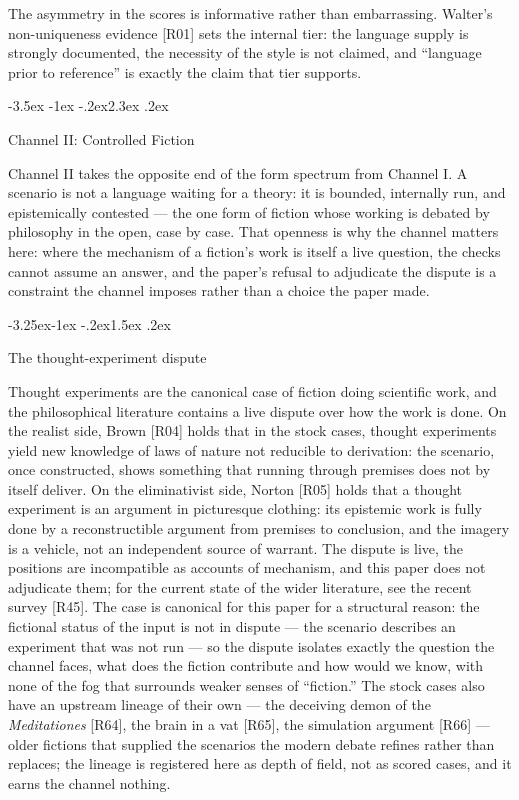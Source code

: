 \documentclass[11pt,a4paper]{article}
\makeatletter
\renewcommand\section{\@startsection{section}{1}{\z@}%
  {-3.5ex \@plus -1ex \@minus -.2ex}{2.3ex \@plus .2ex}%
  {\normalfont\Large\bfseries\raggedright}}
\renewcommand\subsection{\@startsection{subsection}{2}{\z@}%
  {-3.25ex\@plus -1ex \@minus -.2ex}{1.5ex \@plus .2ex}%
  {\normalfont\large\bfseries\raggedright}}
\makeatother
\begin{document}
The asymmetry in the scores is informative rather than embarrassing. Walter's non-uniqueness evidence [R01] sets the internal tier: the language supply is strongly documented, the necessity of the style is not claimed, and ``language prior to reference'' is exactly the claim that tier supports.

\section{Channel II: Controlled Fiction}

Channel II takes the opposite end of the form spectrum from Channel I. A scenario is not a language waiting for a theory: it is bounded, internally run, and epistemically contested --- the one form of fiction whose working is debated by philosophy in the open, case by case. That openness is why the channel matters here: where the mechanism of a fiction's work is itself a live question, the checks cannot assume an answer, and the paper's refusal to adjudicate the dispute is a constraint the channel imposes rather than a choice the paper made.

\subsection{The thought-experiment dispute}

Thought experiments are the canonical case of fiction doing scientific work, and the philosophical literature contains a live dispute over how the work is done. On the realist side, Brown [R04] holds that in the stock cases, thought experiments yield new knowledge of laws of nature not reducible to derivation: the scenario, once constructed, shows something that running through premises does not by itself deliver. On the eliminativist side, Norton [R05] holds that a thought experiment is an argument in picturesque clothing: its epistemic work is fully done by a reconstructible argument from premises to conclusion, and the imagery is a vehicle, not an independent source of warrant. The dispute is live, the positions are incompatible as accounts of mechanism, and this paper does not adjudicate them; for the current state of the wider literature, see the recent survey [R45]. The case is canonical for this paper for a structural reason: the fictional status of the input is not in dispute — the scenario describes an experiment that was not run — so the dispute isolates exactly the question the channel faces, what does the fiction contribute and how would we know, with none of the fog that surrounds weaker senses of ``fiction.'' The stock cases also have an upstream lineage of their own — the deceiving demon of the \textit{Meditationes} [R64], the brain in a vat [R65], the simulation argument [R66] — older fictions that supplied the scenarios the modern debate refines rather than replaces; the lineage is registered here as depth of field, not as scored cases, and it earns the channel nothing.
\end{document}
